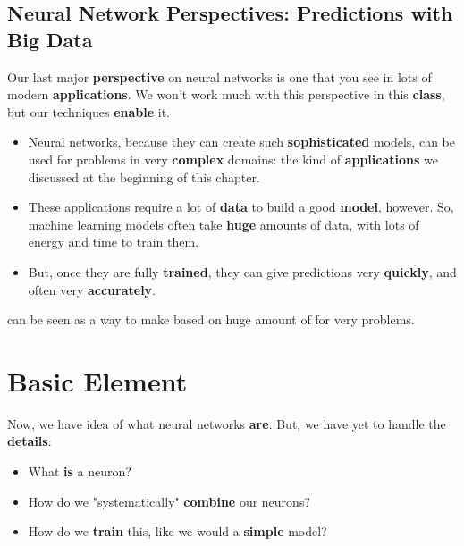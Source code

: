     \subsection{Neural Network Perspectives: Predictions with Big Data}
    
        Our last major \textbf{perspective} on neural networks is one that you see in lots of modern \textbf{applications}. We won't work much with this perspective in this \textbf{class}, but our techniques \textbf{enable} it.

        \begin{itemize}
            \item Neural networks, because they can create such \textbf{sophisticated} models, can be used for problems in very \textbf{complex} domains: the kind of \textbf{applications} we discussed at the beginning of this chapter.

            \item These applications require a lot of \textbf{data} to build a good \textbf{model}, however. So, machine learning models often take \textbf{huge} amounts of data, with lots of energy and time to train them.

            \item But, once they are fully \textbf{trained}, they can give predictions very \textbf{quickly}, and often very \textbf{accurately}.\\
        \end{itemize}
        
        
        
        
        
        
        
        \begin{concept}
             can be seen as a way to make  based on huge amount of  for very  problems.
        \end{concept}
        

\section{Basic Element}

    Now, we have idea of what neural networks \textbf{are}. But, we have yet to handle the \textbf{details}:
    
    \begin{itemize}
        \item What \textbf{is} a neuron?
        \item How do we "systematically" \textbf{combine} our neurons?
        \item How do we \textbf{train} this, like we would a \textbf{simple} model?
    \end{itemize}
    
